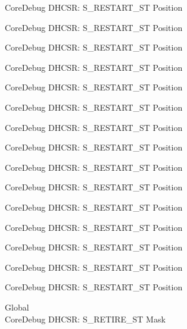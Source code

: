 \begin{DoxyRefList}
\label{deprecated__deprecated000107}%
%
Core\+Debug DHCSR\+: S\+\_\+\+RESTART\+\_\+\+ST Position 

\label{deprecated__deprecated000161}%
%
Core\+Debug DHCSR\+: S\+\_\+\+RESTART\+\_\+\+ST Position 

\label{deprecated__deprecated000246}%
%
Core\+Debug DHCSR\+: S\+\_\+\+RESTART\+\_\+\+ST Position 

\label{deprecated__deprecated000303}%
%
Core\+Debug DHCSR\+: S\+\_\+\+RESTART\+\_\+\+ST Position 

\label{deprecated__deprecated000379}%
%
Core\+Debug DHCSR\+: S\+\_\+\+RESTART\+\_\+\+ST Position 

\label{deprecated__deprecated000458}%
%
Core\+Debug DHCSR\+: S\+\_\+\+RESTART\+\_\+\+ST Position 

\label{deprecated__deprecated000560}%
%
Core\+Debug DHCSR\+: S\+\_\+\+RESTART\+\_\+\+ST Position 

\label{deprecated__deprecated000685}%
%
Core\+Debug DHCSR\+: S\+\_\+\+RESTART\+\_\+\+ST Position 

\label{deprecated__deprecated000785}%
%
Core\+Debug DHCSR\+: S\+\_\+\+RESTART\+\_\+\+ST Position 

\label{deprecated__deprecated000839}%
%
Core\+Debug DHCSR\+: S\+\_\+\+RESTART\+\_\+\+ST Position 

\label{deprecated__deprecated000924}%
%
Core\+Debug DHCSR\+: S\+\_\+\+RESTART\+\_\+\+ST Position 

\label{deprecated__deprecated000981}%
%
Core\+Debug DHCSR\+: S\+\_\+\+RESTART\+\_\+\+ST Position 

\label{deprecated__deprecated001057}%
%
Core\+Debug DHCSR\+: S\+\_\+\+RESTART\+\_\+\+ST Position 

\label{deprecated__deprecated001136}%
%
Core\+Debug DHCSR\+: S\+\_\+\+RESTART\+\_\+\+ST Position 

\label{deprecated__deprecated001238}%
%
Core\+Debug DHCSR\+: S\+\_\+\+RESTART\+\_\+\+ST Position  
\item[Global \doxylink{group___c_m_s_i_s___core_debug_ga89dceb5325f6bcb36a0473d65fbfcfa6}{Core\+Debug\+\_\+\+DHCSR\+\_\+\+S\+\_\+\+RETIRE\+\_\+\+ST\+\_\+\+Msk} ]\hfill \\
\label{deprecated__deprecated000012}%
%
Core\+Debug DHCSR\+: S\+\_\+\+RETIRE\+\_\+\+ST Mask 


\end{DoxyRefList}
